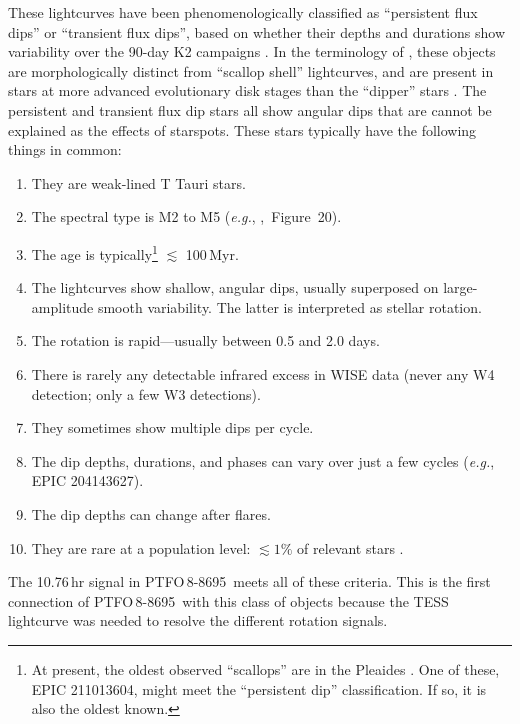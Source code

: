 \documentclass[12pt,twocolumn,tighten]{aastex62}
\newcommand{\ptfo}{PTFO$\,$8-8695}
\begin{document}
These lightcurves have been phenomenologically classified as
``persistent flux dips'' or ``transient flux dips'', based on whether
their depths and durations show variability over the 90-day K2
campaigns \citep{stauffer_orbiting_2017}.  In the terminology of
\citet{stauffer_orbiting_2017}, these objects are morphologically
distinct from ``scallop shell'' lightcurves, and are present in stars
at more advanced evolutionary disk stages than the ``dipper'' stars
\citep{ansdell_young_2016,cody_manyfaceted_2018}.  The persistent and
transient flux dip stars all show angular dips that are cannot be
explained as the effects of starspots.  These stars typically have the
following things in common:
\begin{enumerate}[topsep=0.5ex,itemsep=-0.5ex,partopsep=1ex,parsep=1.5ex]
  \item They are weak-lined T Tauri stars.
  \item The spectral type is M2 to M5 ({\it e.g.},
    \citealt{rebull_usco_2018},~Figure~20).
  \item The age is typically\footnote{
    At present, the oldest observed ``scallops'' are in the Pleaides
    \citep{rebull_rotation_2016}. One of these, EPIC 211013604, might
    meet the ``persistent dip'' classification.  If so, it is also the
    oldest known.
    } $\lesssim$ 100$\,$Myr.
  \item The lightcurves show shallow, angular dips, usually superposed
    on large-amplitude smooth variability. The latter is interpreted
    as stellar rotation.
  \item The rotation is rapid---usually between 0.5 and 2.0 days.
  \item There is rarely any detectable infrared excess in WISE data
  (never any W4 detection; only a few W3 detections).
  \item They sometimes show multiple dips per cycle.
  \item The dip depths, durations, and phases can vary over just a few
    cycles ({\it e.g.}, EPIC 204143627).
  \item The dip depths can change after flares.
  \item They are rare at a population level: $\lesssim 1\%$ of relevant stars
    \citep{rebull_usco_2018}.
\end{enumerate}
The 10.76$\,$hr signal in \ptfo\ meets all of these criteria.  This is
the first connection of \ptfo\ with this class of objects because the
TESS lightcurve was needed to resolve the different rotation signals.
\end{document}
